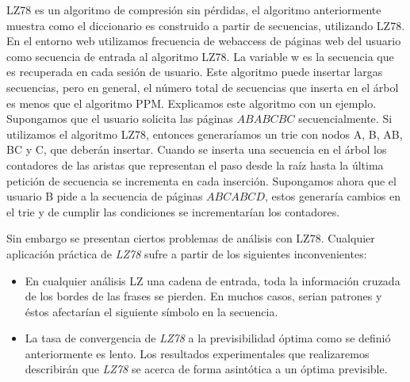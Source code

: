  


LZ78 es un algoritmo de compresión sin pérdidas, el algoritmo anteriormente muestra  como el diccionario es construido  a partir de secuencias, utilizando LZ78. En el entorno web utilizamos frecuencia de webaccess de páginas web del usuario como secuencia de entrada al algoritmo LZ78. La variable w es la secuencia que es recuperada en cada sesión de usuario. Este algoritmo puede insertar largas secuencias, pero en general, el número total de secuencias que inserta en el árbol es menos que el algoritmo PPM. Explicamos este algoritmo con un ejemplo. Supongamos que el usuario solicita las páginas $ABABCBC$ secuencialmente. Si utilizamos el algoritmo LZ78, entonces generaríamos un trie con nodos  A, B, AB, BC y C, que deberán insertar. 
Cuando se inserta una secuencia en el árbol los contadores de las aristas que representan el paso desde la raíz hasta la última petición de secuencia se incrementa en cada inserción. Supongamos ahora que el usuario B pide a la secuencia de páginas $ABCABCD$, estos generaría cambios en el trie y de cumplir las condiciones se incrementarían los contadores. 






Sin embargo se presentan ciertos problemas de análisis con LZ78. Cualquier aplicación práctica de \emph{LZ78} sufre a partir de los siguientes inconvenientes: 

\begin{itemize}
	\item En cualquier análisis LZ  una cadena de entrada, toda la información cruzada de los bordes de las frases se pierden. En muchos casos, serian patrones y éstos afectarían el siguiente símbolo en la secuencia.
	
	\item La tasa de convergencia de \emph{LZ78} a la previsibilidad óptima como se definió anteriormente es lento. Los resultados experimentales que realizaremos  describirán que \emph{LZ78} se acerca de forma asintótica a un óptima previsible.
	
	
	
\end{itemize}


